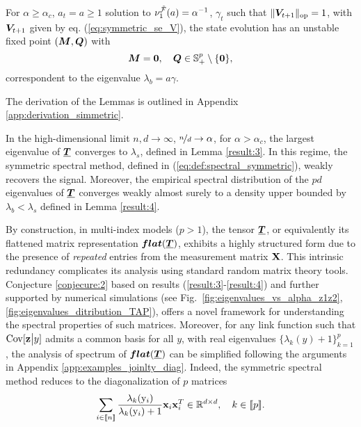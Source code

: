 \begin{lemma} \label{result:4}For $\alpha \geq \alpha_c$, $a_t = a\geq1$ solution to $\nu_1^{\tilde{{\mathcal F}}}(a) = \alpha^{-1}$, $\gamma_t$ such that $ \|{\boldsymbol V}_{t+1} \|_{\mathrm{op}} =1$, with ${\boldsymbol V}_{t+1}$ given by eq. (\ref{eq:symmetric_se_V}), the state evolution has an unstable fixed point $({\boldsymbol M},{\boldsymbol Q})$ with
\begin{equation}
    {\boldsymbol M} = {\boldsymbol 0},\quad{\boldsymbol Q}\in\mathbb{S}_+^p \setminus \{{\boldsymbol 0}\},
\end{equation}
correspondent to the eigenvalue $\lambda_b = a\gamma$.
\end{lemma}
The derivation of the Lemmas is outlined in Appendix \ref{app:derivation_simmetric}.
\begin{conjecture}
\label{conjecure:2}
    In the high-dimensional limit $n,d\to\infty$, $\nicefrac{n}{d}\to\alpha$, for $\alpha>\alpha_c$, the largest eigenvalue of ${\underline{\bm{T}}}$ converges to $\lambda_s$, defined in Lemma \ref{result:3}. In this regime, the symmetric spectral method, defined in (\ref{eq:def:spectral_symmetric}), weakly recovers the signal. Moreover, the empirical spectral distribution of the $pd$ eigenvalues of ${\underline{\bm{T}}}$ converges weakly almost surely to a density upper bounded by $\lambda_b<\lambda_s$ defined in Lemma \ref{result:4}.
\end{conjecture}
By construction, in multi-index models (\( p > 1 \)), the tensor \( {\underline{\bm{T}}} \), or equivalently its flattened matrix representation \( \bm{flat}({\underline{\bm{T}}}) \), exhibits a highly structured form due to the presence of \emph{repeated} entries from the measurement matrix \( \boldsymbol{\mathbf{X}} \). This intrinsic redundancy complicates its analysis using standard random matrix theory tools. Conjecture \ref{conjecure:2} based on results (\ref{result:3}-\ref{result:4}) and further supported by numerical simulations (see Fig.~\ref{fig:eigenvalues_vs_alpha_z1z2}, \ref{fig:eigenvalues_ditribution_TAP}), offers a novel framework for understanding the spectral properties of such matrices. Moreover, for any link function such that $\mathrm{Cov}[\boldsymbol{\mathbf{z}}\big|y]$ admits a common basis for all $y$, with real eigenvalues $\{\lambda_k(y)+1\}_{k=1}^p$, the analysis of spectrum of $\bm{flat}({\underline{\bm{T}}})$ can be simplified following the arguments in Appendix \ref{app:examples_joinlty_diag}. Indeed, the symmetric spectral method reduces to the diagonalization of $p$ matrices \begin{equation}
\sum_{i\in \llbracket n \rrbracket }\frac{\lambda_k({ \mathrm{y} }_i)}{\lambda_k({ \mathrm{y} }_i)+1}\boldsymbol{\mathbf{x}}_i\boldsymbol{\mathbf{x}}_i^T\in\mathbb{R}^{d\times d}, \quad k\in \llbracket p \rrbracket .\end{equation} 
